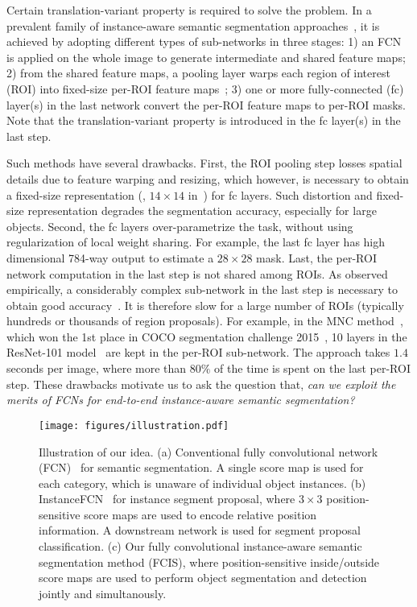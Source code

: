 \documentclass[10pt,twocolumn,letterpaper]{article}
\begin{document}
Certain translation-variant property is required to solve the problem. In a prevalent family of instance-aware semantic segmentation approaches~\cite{dai2015convolutional,hariharan2015hyper,dai2016mnc}, it is achieved by adopting different types of sub-networks in three stages: 1) an FCN is applied on the whole image to generate intermediate and shared feature maps; 2) from the shared feature maps, a pooling layer warps each region of interest (ROI) into fixed-size per-ROI feature maps~\cite{he2014spatial,girshick2015fast}; 3) one or more fully-connected (fc) layer(s) in the last network convert the per-ROI feature maps to per-ROI masks. Note that the translation-variant property is introduced in the fc layer(s) in the last step.

Such methods have several drawbacks. First, the ROI pooling step losses spatial details due to feature warping and resizing, which however, is necessary to obtain a fixed-size representation (\eg, $14 \times 14$ in~\cite{dai2016mnc}) for fc layers. Such distortion and fixed-size representation degrades the segmentation accuracy, especially for large objects. Second, the fc layers over-parametrize the task, without using regularization of local weight sharing. For example, the last fc layer has high dimensional 784-way output to estimate a $28 \times 28$ mask. Last, the per-ROI network computation in the last step is not shared among ROIs. As observed empirically, a considerably complex sub-network in the last step is necessary to obtain good accuracy~\cite{ren2015object,dai2016rfcn}. It is therefore slow for a large number of ROIs (typically hundreds or thousands of region proposals). For example, in the MNC method~\cite{dai2016mnc}, which won the 1st place in COCO segmentation challenge 2015~\cite{lin2014coco}, 10 layers in the ResNet-101 model~\cite{he2016deep} are kept in the per-ROI sub-network. The approach takes $1.4$ seconds per image, where more than $80\%$ of the time is spent on the last per-ROI step. These drawbacks motivate us to ask the question that, \emph{can we exploit the merits of FCNs for end-to-end instance-aware semantic segmentation?}

\begin{figure*}
	\centering
	\texttt{[image: figures/illustration.pdf]}
	\caption{Illustration of our idea. (a) Conventional fully convolutional network (FCN)~\cite{long2015fully} for semantic segmentation. A single score map is used for each category, which is unaware of individual object instances. (b) InstanceFCN~\cite{dai2016instance} for instance segment proposal, where $3\times 3$ position-sensitive score maps are used to encode relative position information. A downstream network is used for segment proposal classification. (c) Our fully convolutional instance-aware semantic segmentation method (FCIS), where position-sensitive inside/outside score maps are used to perform object segmentation and detection jointly and simultanously.}
	\label{fig:instance_sensitive_score_map}
\end{figure*}
\end{document}
